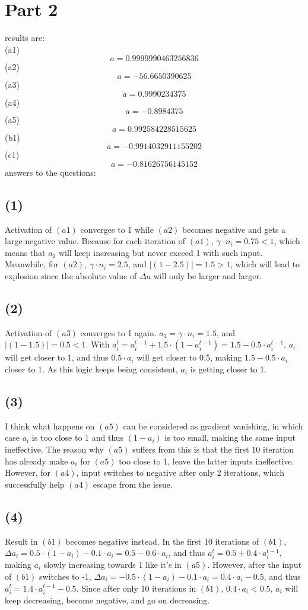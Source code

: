 \documentclass{article}
\begin{document}
\section*{Part 2}
results are:\\
(a1) \[a = 0.9999990463256836\]
(a2) \[a = -56.6650390625\]
(a3) \[a = 0.9990234375\]
(a4) \[a = -0.8984375\]
(a5) \[a = 0.992584228515625\]
(b1) \[a = -0.9914032911155202\]
(c1) \[a = -0.81626756145152\]
answers to the questions:
\subsection*{(1)}
Activation of $(a1)$ converges to 1 while $(a2)$ becomes negative and gets a large negative 
value. Because for each iteration of $(a1)$, $\gamma\cdot n_i = 0.75 < 1$,
which means that $a_1$ will keep increasing but never exceed 1 with such input. Meanwhile, 
for $(a2)$, $\gamma\cdot n_i = 2.5$, and $|(1-2.5)|=1.5 > 1$, which will lead 
to explosion since the absolute value of $\Delta a$ will only be larger and 
larger.

\subsection*{(2)}
Activation of $(a3)$ converges to 1 again. $a_1 = \gamma\cdot n_i = 1.5$, and 
$|(1-1.5)|=0.5 < 1$. With $a_i^t = a_i^{t-1} + 1.5\cdot (1-a_i^{t-1}) = 1.5 - 
0.5\cdot a_i^{t-1}$, $a_i$ will get closer to 1, and thus $0.5\cdot a_i$ 
will get closer to 0.5, making $1.5 - 0.5\cdot a_i$ closer to 1. As 
this logic keeps being consistent, $a_i$ is getting closer to 1.

\subsection*{(3)}
I think what happens on $(a5)$ can be considered as gradient vanishing, 
in which case $a_i$ is too close to 1 and thus $(1-a_i)$ is too small, 
making the same input ineffective. The reason why $(a5)$ suffers from this
is that the first 10 iteration has already make $a_i$ for $(a5)$ too close
to 1, leave the latter inputs ineffective. However, for $(a4)$, input
switches to negative after only 2 iterations, which successfully help $(a4)$
escape from the issue.

\subsection*{(4)}
Result in $(b1)$ becomes negative instead. In the first 10 iterations of $(b1)$, 
$\Delta a_i = 0.5\cdot (1 - a_i) - 0.1\cdot a_i = 0.5 - 0.6\cdot a_i$, and
thus $a_i^t = 0.5 + 0.4\cdot a_i^{t-1}$, making $a_i$ slowly increasing towards
1 like it's in $(a5)$. However, after the input of $(b1)$ switches to -1,
$\Delta a_i = -0.5\cdot (1 - a_i) - 0.1\cdot a_i = 0.4\cdot a_i - 0.5$, and
thus $a_i^t = 1.4\cdot a_i^{t-1} - 0.5$. Since after only 10 iterations in $(b1)$,
$0.4\cdot a_i < 0.5$, $a_i$ will keep decreasing, become negative, and go 
on decreasing.
\end{document}
